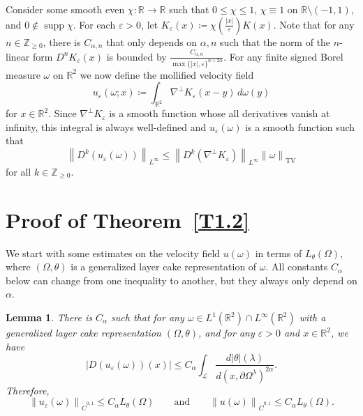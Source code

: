 \documentclass[reqno,centertags,12pt]{amsart}
\newtheorem{lemma}[theorem]{Lemma}
\theoremstyle{definition}
\numberwithin{equation}{section}
\newcommand{\abs}[1]{\left\lvert#1\right\rvert}
\newcommand{\norm}[1]{\left\|#1\right\|}
\newcommand{\bbR}{{\mathbb{R}}}
\newcommand{\bbZ}{{\mathbb{Z}}}
\newcommand{\eps}{\varepsilon}
\newcommand{\tht}{\theta}
\begin{document}
Consider some smooth even $\chi\colon\bbR\to\bbR$
such that $0\leq\chi\leq 1$, $\chi\equiv 1$ on $\bbR\setminus(-1,1)$, and
$0\notin\operatorname{supp}\chi$. For each $\eps>0$, let
$K_{\eps}(x) \coloneqq \chi\left(\frac{\abs{x}}{\eps}\right)K(x)$.
Note that for any $n\in\bbZ_{\geq 0}$, there is $C_{\alpha,n}$
that only depends on $\alpha,n$ such that the norm of the $n$-linear form
$D^{n}K_{\eps}(x)$ is bounded by
$\frac{C_{\alpha,n}}{\max\{\abs{x},\eps\}^{n+2\alpha}}$.
For any finite signed Borel measure $\omega$ on $\bbR^{2}$
we now define the mollified velocity field
\[
    u_{\eps}(\omega;x)\coloneqq
    \int_{\bbR^{2}}\nabla^{\perp}K_{\eps}(x-y)\,d\omega(y)
\]
for $x\in\bbR^{2}$. Since $\nabla^{\perp}K_{\eps}$ is a smooth function
whose all derivatives vanish at infinity,
this integral is always well-defined and $u_{\eps}(\omega)$ is a smooth function such that
\begin{equation}\label{1.8}
    \norm{D^{k}(u_{\eps}(\omega))}_{L^{\infty}} \leq
    \norm{D^{k}(\nabla^{\perp}K_{\eps})}_{L^{\infty}}\norm{\omega}_{\mathrm{TV}}
\end{equation}
for all $k\in\bbZ_{\geq 0}$.


\section{Proof of Theorem~\ref{T1.2}}

We start with some estimates on the velocity field $u(\omega)$
in terms of $L_{\tht}(\Omega)$, where $(\Omega,\theta)$ is
a generalized layer cake representation of $\omega$.
All constants $C_{\alpha}$ below
can change from one inequality to another, but they always only depend  on $\alpha$.

\begin{lemma}\label{L2.1}
    There is $C_{\alpha}$ such that for any
    $\omega\in L^{1}(\bbR^{2})\cap L^{\infty}(\bbR^{2})$
    with a generalized layer cake representation $(\Omega,\theta)$, and for any
    $\eps>0$ and $x\in\bbR^{2}$, we have
    \[
        \abs{D(u_{\eps}(\omega))(x)} \leq
        C_{\alpha}\int_{\mathcal{L}}\frac{d|\theta|(\lambda)}
        {d(x,\partial\Omega^{\lambda})^{2\alpha}}.
    \]
    Therefore,
    \[
        \norm{u_\eps(\omega)}_{\dot{C}^{0,1}} \leq C_{\alpha}L_{\tht}(\Omega)
        \qquad\text{and} \qquad \norm{u(\omega)}_{\dot{C}^{0,1}} \leq C_{\alpha}L_{\tht}(\Omega).
    \]
\end{lemma}
\end{document}
